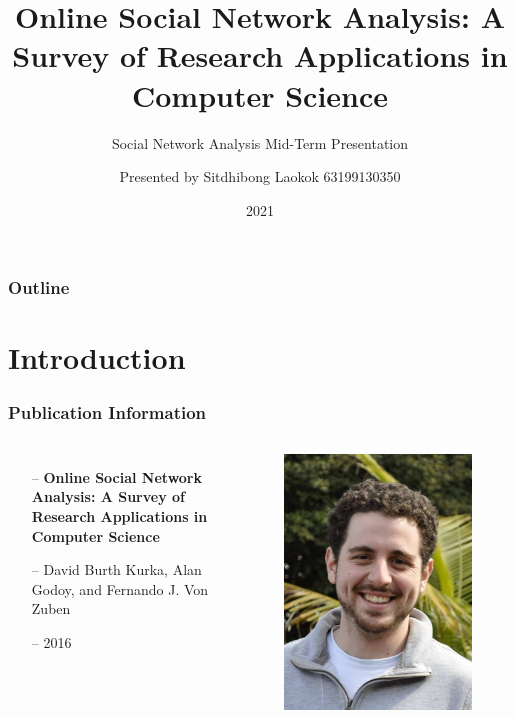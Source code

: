 \documentclass[8pt]{beamer}
\title{Online Social Network Analysis: A Survey of Research Applications in Computer Science}
\subtitle{Social Network Analysis Mid-Term Presentation}
\author{Presented by {\newline}Sitdhibong Laokok {\newline}63199130350}
\date{2021}
\begin{document}
  \frame{\titlepage}
  
  \begin{frame}
  	\frametitle{Outline}
  	\tableofcontents
  \end{frame}

  \section{Introduction}
  \begin{frame}
  	\frametitle{Publication Information}
  	\begin{columns}
  			\begin{itemize}
  				\item[--] \textbf{Online Social Network Analysis: A Survey of Research Applications in Computer Science}
  				\item[--] David Burth Kurka, Alan Godoy, and Fernando J. Von Zuben
  				\item[--] 2016
  			\end{itemize}
  		
  		\begin{figure}
  			\includegraphics[scale=0.2]{asset/portrait.jpg}
  		\end{figure}
  	\end{columns}
  \end{frame}
  
\end{document}
